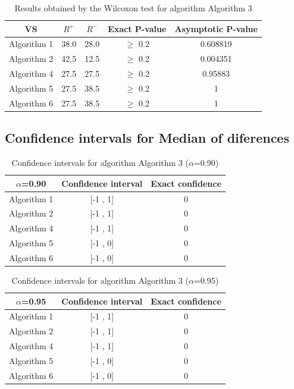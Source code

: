 \documentclass[a4paper,10pt]{article}
\begin{document}
\begin{table}[!htp]
\centering\small
\begin{tabular}{
|c|c|c|c|c|}
\hline
 VS & $R^{+}$ & $R^{-}$ & Exact P-value & Asymptotic P-value \\ \hline 
Algorithm 1 & 38.0 & 28.0 & $\geq$ 0.2 & 0.608819\\ \hline 
Algorithm 2 & 42.5 & 12.5 & $\geq$ 0.2 & 0.004351\\ \hline 
Algorithm 4 & 27.5 & 27.5 & $\geq$ 0.2 & 0.95883\\ \hline 
Algorithm 5 & 27.5 & 38.5 & $\geq$ 0.2 & 1\\ \hline 
Algorithm 6 & 27.5 & 38.5 & $\geq$ 0.2 & 1\\ \hline 

\end{tabular}
\caption{Results obtained by the Wilcoxon test for algorithm Algorithm 3}
\end{table}

\subsection{Confidence intervals for Median of diferences}

\begin{table}[!htp]
\centering\small
\begin{tabular}{
|c|c|c|}
\hline
 $\alpha$=0.90 & Confidence interval & Exact confidence \\ \hline 
Algorithm 1 & [-1 , 1] & 0\\ \hline 
Algorithm 2 & [-1 , 1] & 0\\ \hline 
Algorithm 4 & [-1 , 1] & 0\\ \hline 
Algorithm 5 & [-1 , 0] & 0\\ \hline 
Algorithm 6 & [-1 , 0] & 0\\ \hline 

\end{tabular}
\caption{Confidence intervals for algorithm Algorithm 3 ($\alpha$=0.90)}
\end{table}
\begin{table}[!htp]
\centering\small
\begin{tabular}{
|c|c|c|}
\hline
 $\alpha$=0.95 & Confidence interval & Exact confidence \\ \hline 
Algorithm 1 & [-1 , 1] & 0\\ \hline 
Algorithm 2 & [-1 , 1] & 0\\ \hline 
Algorithm 4 & [-1 , 1] & 0\\ \hline 
Algorithm 5 & [-1 , 0] & 0\\ \hline 
Algorithm 6 & [-1 , 0] & 0\\ \hline 

\end{tabular}
\caption{Confidence intervals for algorithm Algorithm 3 ($\alpha$=0.95)}
\end{table}
\end{document}
